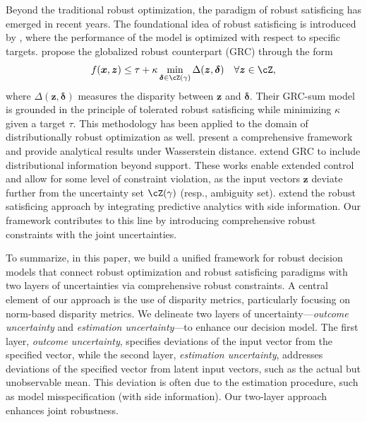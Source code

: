\documentclass[mnsc, nonblindrev]{informswp}
\newcommand{\1}[1]{\mathds{1}{\left(#1\right)}}
\begin{document}
Beyond the traditional robust optimization, the paradigm of robust satisficing has emerged in recent years. The foundational idea of robust satisficing is introduced by \cite{Brown_Sim_2009}, where the performance of the model is optimized with respect to specific targets. \cite{BenTal_et_al_2017globalized} propose the globalized robust counterpart (GRC) through the form
$$
f(\bm x, \bm z) \leq \tau + \kappa \min_{\bm \delta \in \cZ(\gamma)} \Delta(\bm z, \bm \delta) ~~~\forall \bm z \in \cZ,
$$
where $\Delta(\bm z, \bm \delta)$ measures the disparity between $\bm z$ and $\bm \delta$. Their GRC-sum model is grounded in the principle of tolerated robust satisficing while minimizing $\kappa$ given a target $\tau$. This methodology has been applied to the domain of distributionally robust optimization as well. \cite{Long_Sim_Zhou_2023robust} present a comprehensive framework and provide analytical results under Wasserstein distance. \cite{liu2023globalized} extend GRC to include distributional information beyond support. These works enable extended control and allow for some level of constraint violation, as the input vectors $\bm z$ deviate further from the uncertainty set $\cZ(\gamma)$ (resp., ambiguity set). \cite{sim2024analytics} extend the robust satisficing approach by integrating predictive analytics with side information. Our framework contributes to this line by introducing comprehensive robust constraints with the joint uncertainties.

To summarize, in this paper, we build a unified framework for robust decision models that connect robust optimization and robust satisficing paradigms with two layers of uncertainties via comprehensive robust constraints. A central element of our approach is the use of disparity metrics, particularly focusing on norm-based disparity metrics. We delineate two layers of uncertainty---\emph{outcome uncertainty} and \emph{estimation uncertainty}---to enhance our decision model. The first layer, \emph{outcome uncertainty}, specifies deviations of the input vector from the specified vector, while the second layer, \emph{estimation uncertainty}, addresses deviations of the specified vector from latent input vectors, such as the actual but unobservable mean. This deviation is often due to the estimation procedure, such as model misspecification (with side information). Our two-layer approach enhances joint robustness.
\end{document}
